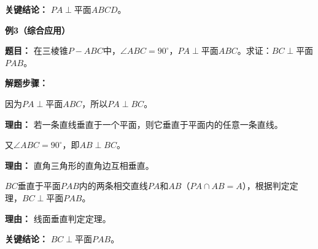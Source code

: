 \begin{examplebox}
	\medskip
	\textbf{\textcolor{CExample}{关键结论：}}
	$PA\perp$平面$ABCD$。

	\medskip
	\textbf{\textcolor{CExample}{例3（综合应用）}}

	\medskip
	\textbf{\textcolor{CExample}{题目：}}
	在三棱锥$P-ABC$中，$\angle ABC=90^\circ$，$PA\perp$平面$ABC$。求证：$BC\perp$平面$PAB$。

	\medskip
	\textbf{\textcolor{CExample}{解题步骤：}}
	\begin{description}[style=nextline, leftmargin=2.8em, labelsep=0.5em, itemsep=0.45em]
		\item[\textbf{第一步（由性质得线线垂直）：}]
			因为$PA\perp$平面$ABC$，所以$PA\perp BC$。
			\par\textbf{理由：} 若一条直线垂直于一个平面，则它垂直于平面内的任意一条直线。
		\item[\textbf{第二步（利用已知垂直）：}]
			又$\angle ABC=90^\circ$，即$AB\perp BC$。
			\par\textbf{理由：} 直角三角形的直角边互相垂直。
		\item[\textbf{第三步（判定定理）：}]
			$BC$垂直于平面$PAB$内的两条相交直线$PA$和$AB$（$PA\cap AB=A$），根据判定定理，$BC\perp$平面$PAB$。
			\par\textbf{理由：} 线面垂直判定定理。
	\end{description}

	\medskip
	\textbf{\textcolor{CExample}{关键结论：}}
	$BC\perp$平面$PAB$。
\end{examplebox}
